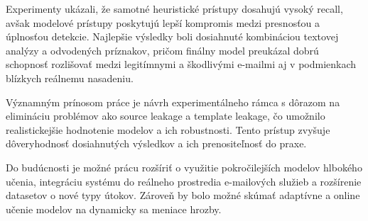 \documentclass[conference]{IEEEtran}
\begin{document}
Experimenty ukázali, že samotné heuristické prístupy dosahujú vysoký recall, avšak modelové prístupy poskytujú lepší kompromis medzi presnosťou a úplnosťou detekcie. Najlepšie výsledky boli dosiahnuté kombináciou textovej analýzy a odvodených príznakov, pričom finálny model preukázal dobrú schopnosť rozlišovať medzi legitímnymi a škodlivými e-mailmi aj v podmienkach blízkych reálnemu nasadeniu.

Významným prínosom práce je návrh experimentálneho rámca s dôrazom na elimináciu problémov ako source leakage a template leakage, čo umožnilo realistickejšie hodnotenie modelov a ich robustnosti. Tento prístup zvyšuje dôveryhodnosť dosiahnutých výsledkov a ich prenositeľnosť do praxe.

Do budúcnosti je možné prácu rozšíriť o využitie pokročilejších modelov hlbokého učenia, integráciu systému do reálneho prostredia e-mailových služieb a rozšírenie datasetov o nové typy útokov. Zároveň by bolo možné skúmať adaptívne a online učenie modelov na dynamicky sa meniace hrozby.
\end{document}
